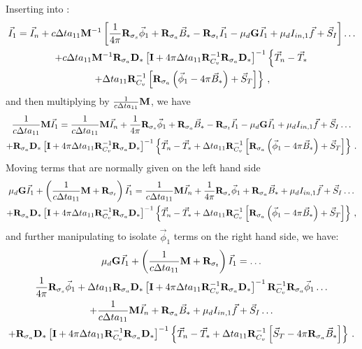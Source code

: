 \label{eq:iso_T1}
\eenum
%
%
Inserting  into :
\begin{multline}
\vec{I}_1 = \vec{I}_n + c\Delta t a_{11} \mathbf M^{-1}\left[   
\frac{1}{4\pi}\mathbf{R}_{\sigma_s}\vec{\phi}_1 + \mathbf{R}_{\sigma_a}\vec{B}_* - \mathbf{R}_{\sigma_t} \vec{I}_1 - \mu_d \mathbf{G}\vec{I}_1 + \mu_d I_{in,1}\vec{f} + \vec{S}_I \right] \dots  \\
+ c \Delta t a_{11} \mathbf M^{-1} \mathbf{R}_{\sigma_a} \mathbf{D}_* 
\left[ \mathbf{I}  + 4\pi\Delta t a_{11}  \mathbf{R}_{C_v}^{-1}\mathbf{R}_{\sigma_a} \mathbf{D}_*    \right]^{-1}
\left\{ \vec{T}_n - \vec{T}_* \right. \\
\left. +  \Delta t a_{11} \mathbf{R}_{C_v}^{-1}\left[ \mathbf{R}_{\sigma_a} \left(\vec{\phi}_1 - 4\pi\vec{B}_*\right) + \vec{S}_T \right]\right\} \, ,
\end{multline}
%
%
%
and then multiplying by $\frac{1}{c\Delta t a_{11}} \mathbf M$, we have
\begin{multline}
\frac{1}{c\Delta t a_{11}} \mathbf M\vec{I}_1 = \frac{1}{c\Delta t a_{11}} \mathbf M\vec{I}_n + 
\frac{1}{4\pi}\mathbf{R}_{\sigma_s}\vec{\phi}_1 + \mathbf{R}_{\sigma_a}\vec{B}_* - \mathbf{R}_{\sigma_t} \vec{I}_1 - \mu_d \mathbf{G}\vec{I}_1 + \mu_d I_{in,1}\vec{f}  + \vec{S}_I\dots  \\
+ \mathbf{R}_{\sigma_a}  \mathbf{D}_* 
\left[ \mathbf{I} + 4\pi\Delta t a_{11}  \mathbf{R}_{C_v}^{-1}\mathbf{R}_{\sigma_a} \mathbf{D}_*    \right]^{-1}
\left\{\vec{T}_n - \vec{T}_* +  \Delta t a_{11} \mathbf{R}_{C_v}^{-1}\left[ \mathbf{R}_{\sigma_a} \left(\vec{\phi}_1 - 4\pi\vec{B}_*\right) + \vec{S}_T\right]\right\}  \, .
\end{multline}
%
%
%
Moving terms that are normally given on the left hand side
\begin{multline}
\mu_d \mathbf{G}\vec{I}_1 + \left(\frac{1}{c\Delta t a_{11}}  \mathbf M + \mathbf{R}_{\sigma_t} \right)\vec{I}_1 = \frac{1}{c\Delta t a_{11}} \mathbf M\vec{I}_n +   
\frac{1}{4\pi}\mathbf{R}_{\sigma_s}\vec{\phi}_1 + \mathbf{R}_{\sigma_a}\vec{B}_* + \mu_d I_{in,1} \vec{f} + \vec{S}_I \dots  \\
+ \mathbf{R}_{\sigma_a}  \mathbf{D}_*  \left[ \mathbf{I} + 4\pi\Delta t a_{11}  \mathbf{R}_{C_v}^{-1}\mathbf{R}_{\sigma_a} \mathbf{D}_*    \right]^{-1}
\left\{\vec{T}_n - \vec{T}_* +  \Delta t a_{11}  \mathbf{R}_{C_v}^{-1}\left[ \mathbf{R}_{\sigma_a} \left(\vec{\phi}_1 - 4\pi\vec{B}_*\right) + \vec{S}_T\right]\right\} \, ,
\end{multline}
%
%
and further manipulating to isolate $\vec{\phi}_1$ terms on the right hand side, we have:
%
%
\begin{multline}
\mu_d \mathbf{ G}\vec{I}_1 + \left(\frac{1}{c\Delta t a_{11}}  \mathbf M + \mathbf{R}_{\sigma_t} \right)\vec{I}_1 = \dots \\
\frac{1}{4\pi}\mathbf{R}_{\sigma_s}\vec{\phi}_1 + \Delta t a_{11} \mathbf{R}_{\sigma_a}  \mathbf{D}_* 
\left[ \mathbf{I}  + 4\pi\Delta t a_{11}  \mathbf{R}_{C_v}^{-1}\mathbf{R}_{\sigma_a}  \mathbf{D}_*    \right]^{-1}
\mathbf{R}_{C_v}^{-1}\mathbf{R}_{\sigma_a} \vec{\phi}_1 \dots \\
+ \frac{1}{c\Delta t a_{11}} \mathbf M \vec{I}_n +\mathbf{R}_{\sigma_a}\vec{B}_* + \mu_d I_{in,1} \vec{f} + \vec{S}_I  \dots \\
+ \mathbf{R}_{\sigma_a}  \mathbf{D}_* 
\left[ \mathbf{I}  +4\pi\Delta t a_{11}  \mathbf{R}_{C_v}^{-1}\mathbf{R}_{\sigma_a}  \mathbf{D}_*    \right]^{-1}
\left\{ \vec{T}_n - \vec{T}_* + \Delta t a_{11}  \mathbf{R}_{C_v}^{-1}\left[ \vec{S}_T - 4\pi\mathbf{R}_{\sigma_a} \vec{B}_*\right] \right\} \, .
\label{eq:almost_1}
\end{multline}
